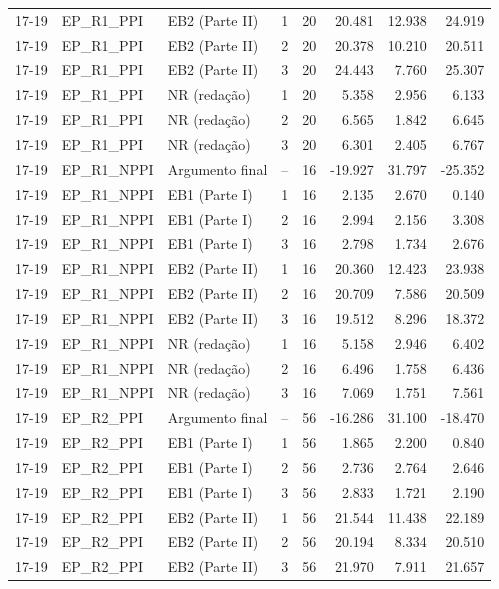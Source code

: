 \begin{longtable}{lllcrrrr}
17-19 & EP\_R1\_PPI & EB2 (Parte II) & 1 & 20 & 20.481 & 12.938 & 24.919 \\
17-19 & EP\_R1\_PPI & EB2 (Parte II) & 2 & 20 & 20.378 & 10.210 & 20.511 \\
17-19 & EP\_R1\_PPI & EB2 (Parte II) & 3 & 20 & 24.443 & 7.760 & 25.307 \\
17-19 & EP\_R1\_PPI & NR (redação) & 1 & 20 & 5.358 & 2.956 & 6.133 \\
17-19 & EP\_R1\_PPI & NR (redação) & 2 & 20 & 6.565 & 1.842 & 6.645 \\
17-19 & EP\_R1\_PPI & NR (redação) & 3 & 20 & 6.301 & 2.405 & 6.767 \\
17-19 & EP\_R1\_NPPI & Argumento final & -- & 16 & -19.927 & 31.797 & -25.352 \\
17-19 & EP\_R1\_NPPI & EB1 (Parte I) & 1 & 16 & 2.135 & 2.670 & 0.140 \\
17-19 & EP\_R1\_NPPI & EB1 (Parte I) & 2 & 16 & 2.994 & 2.156 & 3.308 \\
17-19 & EP\_R1\_NPPI & EB1 (Parte I) & 3 & 16 & 2.798 & 1.734 & 2.676 \\
17-19 & EP\_R1\_NPPI & EB2 (Parte II) & 1 & 16 & 20.360 & 12.423 & 23.938 \\
17-19 & EP\_R1\_NPPI & EB2 (Parte II) & 2 & 16 & 20.709 & 7.586 & 20.509 \\
17-19 & EP\_R1\_NPPI & EB2 (Parte II) & 3 & 16 & 19.512 & 8.296 & 18.372 \\
17-19 & EP\_R1\_NPPI & NR (redação) & 1 & 16 & 5.158 & 2.946 & 6.402 \\
17-19 & EP\_R1\_NPPI & NR (redação) & 2 & 16 & 6.496 & 1.758 & 6.436 \\
17-19 & EP\_R1\_NPPI & NR (redação) & 3 & 16 & 7.069 & 1.751 & 7.561 \\
17-19 & EP\_R2\_PPI & Argumento final & -- & 56 & -16.286 & 31.100 & -18.470 \\
17-19 & EP\_R2\_PPI & EB1 (Parte I) & 1 & 56 & 1.865 & 2.200 & 0.840 \\
17-19 & EP\_R2\_PPI & EB1 (Parte I) & 2 & 56 & 2.736 & 2.764 & 2.646 \\
17-19 & EP\_R2\_PPI & EB1 (Parte I) & 3 & 56 & 2.833 & 1.721 & 2.190 \\
17-19 & EP\_R2\_PPI & EB2 (Parte II) & 1 & 56 & 21.544 & 11.438 & 22.189 \\
17-19 & EP\_R2\_PPI & EB2 (Parte II) & 2 & 56 & 20.194 & 8.334 & 20.510 \\
17-19 & EP\_R2\_PPI & EB2 (Parte II) & 3 & 56 & 21.970 & 7.911 & 21.657 \\

\end{longtable}
